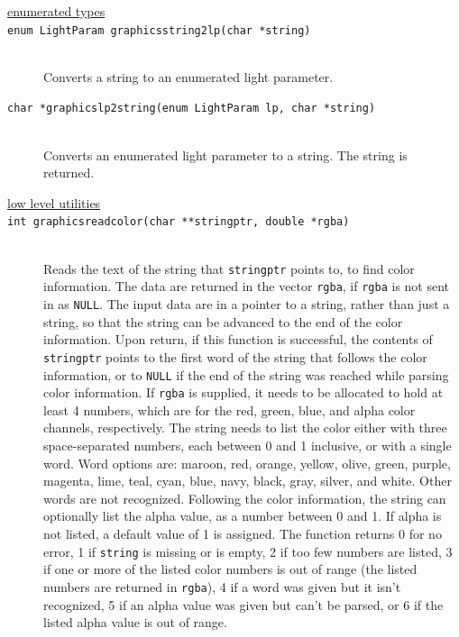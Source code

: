\documentclass {scrbook}
\newcommand {\ttt} {\texttt}
\begin{document}
\begin{description}

\item[\underline{enumerated types}]

\item[\ttt{enum LightParam graphicsstring2lp(char *string)}]
\hfill \\
Converts a string to an enumerated light parameter.

\item[\ttt{char *graphicslp2string(enum LightParam lp, char *string)}]
\hfill \\
Converts an enumerated light parameter to a string. The string is returned.

\item[\underline{low level utilities}]

\item[\ttt{int graphicsreadcolor(char **stringptr, double *rgba)}]
\hfill \\
Reads the text of the string that \ttt{stringptr} points to, to find color information. The data are returned in the vector \ttt{rgba}, if \ttt{rgba} is not sent in as \ttt{NULL}. The input data are in a pointer to a string, rather than just a string, so that the string can be advanced to the end of the color information. Upon return, if this function is successful, the contents of \ttt{stringptr} points to the first word of the string that follows the color information, or to \ttt{NULL} if the end of the string was reached while parsing color information. If \ttt{rgba} is supplied, it needs to be allocated to hold at least 4 numbers, which are for the red, green, blue, and alpha color channels, respectively. The string needs to list the color either with three space-separated numbers, each between 0 and 1 inclusive, or with a single word. Word options are: maroon, red, orange, yellow, olive, green, purple, magenta, lime, teal, cyan, blue, navy, black, gray, silver, and white. Other words are not recognized. Following the color information, the string can optionally list the alpha value, as a number between 0 and 1. If alpha is not listed, a default value of 1 is assigned. The function returns 0 for no error, 1 if \ttt{string} is missing or is empty, 2 if too few numbers are listed, 3 if one or more of the listed color numbers is out of range (the listed numbers are returned in \ttt{rgba}), 4 if a word was given but it isn't recognized, 5 if an alpha value was given but can't be parsed, or 6 if the listed alpha value is out of range.


\end{description}
\end{document}
